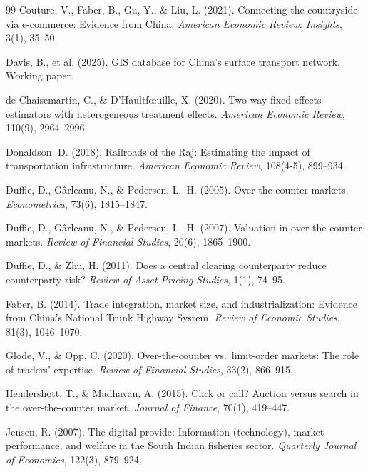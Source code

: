 \documentclass[12pt]{article}
\begin{document}
\begin{thebibliography}{99}
Couture, V., Faber, B., Gu, Y., \& Liu, L. (2021). Connecting the countryside via e-commerce: Evidence from China. \textit{American Economic Review: Insights}, 3(1), 35--50.

Davis, B., et al. (2025). GIS database for China's surface transport network. Working paper.

de Chaisemartin, C., \& D'Haultf\oe uille, X. (2020). Two-way fixed effects estimators with heterogeneous treatment effects. \textit{American Economic Review}, 110(9), 2964--2996.

Donaldson, D. (2018). Railroads of the Raj: Estimating the impact of transportation infrastructure. \textit{American Economic Review}, 108(4-5), 899--934.

Duffie, D., G\^arleanu, N., \& Pedersen, L.~H. (2005). Over-the-counter markets. \textit{Econometrica}, 73(6), 1815--1847.

Duffie, D., G\^arleanu, N., \& Pedersen, L.~H. (2007). Valuation in over-the-counter markets. \textit{Review of Financial Studies}, 20(6), 1865--1900.

Duffie, D., \& Zhu, H. (2011). Does a central clearing counterparty reduce counterparty risk? \textit{Review of Asset Pricing Studies}, 1(1), 74--95.

Faber, B. (2014). Trade integration, market size, and industrialization: Evidence from China's National Trunk Highway System. \textit{Review of Economic Studies}, 81(3), 1046--1070.

Glode, V., \& Opp, C. (2020). Over-the-counter vs.\ limit-order markets: The role of traders' expertise. \textit{Review of Financial Studies}, 33(2), 866--915.

Hendershott, T., \& Madhavan, A. (2015). Click or call? Auction versus search in the over-the-counter market. \textit{Journal of Finance}, 70(1), 419--447.

Jensen, R. (2007). The digital provide: Information (technology), market performance, and welfare in the South Indian fisheries sector. \textit{Quarterly Journal of Economics}, 122(3), 879--924.


\end{thebibliography}
\end{document}
